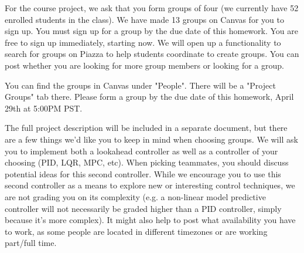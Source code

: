 
For the course project, we ask that you form groups of four (we currently have 52 enrolled students in the class). We have made 13 groups on Canvas for you to sign up. You must sign up for a group by the due date of this homework. You are free to sign up immediately, starting now. We will open up a functionality to search for groups on Piazza to help students coordinate to create groups. You can post whether you are looking for more group members or looking for a group. 

You can find the groups in Canvas under "People". There will be a "Project Groups" tab there. Please form a group by the
due date of this homework, April 29th at 5:00PM PST.

The full project description will be included in a separate document, but there are a few things we'd like you to keep in mind when choosing groups. We will ask you to implement both a lookahead controller as well as a controller of your choosing (PID, LQR, MPC, etc). When picking teammates, you should discuss potential ideas for this second controller. While we encourage you to use this second controller as a means to explore new or interesting control techniques, we are not grading you on its complexity (e.g. a non-linear model predictive controller will not necessarily be graded higher than a PID controller, simply because it's more complex). It might also help to post what availability you have to work, as some people are located in different timezones or are working part/full time.
